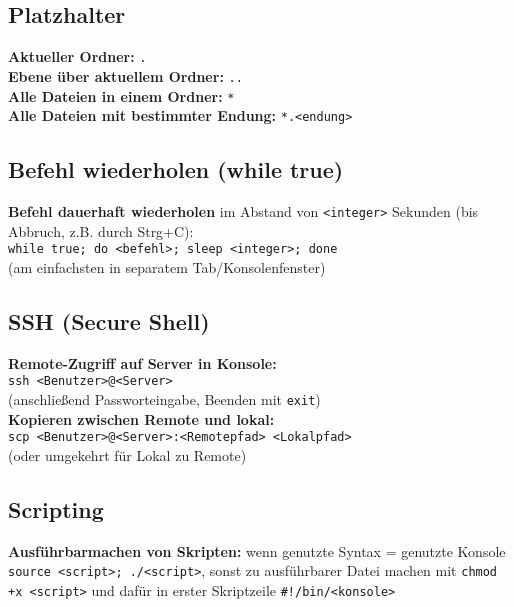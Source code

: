\documentclass[a4paper, twocolumn]{scrarticle}
\begin{document}
\subsection{Platzhalter}
\textbf{Aktueller Ordner:} \lstinline|.|\\
\textbf{Ebene über aktuellem Ordner:} \lstinline|..|\\
\textbf{Alle Dateien in einem Ordner:} \lstinline|*|\\
\textbf{Alle Dateien mit bestimmter Endung:} \lstinline|*.<endung>|

\subsection{Befehl wiederholen (while true)}\label{sec:bash-whiletrue}
\textbf{Befehl dauerhaft wiederholen} im Abstand von \lstinline|<integer>| Sekunden (bis Abbruch, z.B. durch Strg+C):\\ \lstinline|while true; do <befehl>; sleep <integer>; done|\\
(am einfachsten in separatem Tab/Konsolenfenster)

\subsection{SSH (Secure Shell)}
\textbf{Remote-Zugriff auf Server in Konsole:}\\
\lstinline|ssh <Benutzer>@<Server>|\\
(anschließend Passworteingabe, Beenden mit \lstinline|exit|)\\
\textbf{Kopieren zwischen Remote und lokal:}\\
\lstinline|scp <Benutzer>@<Server>:<Remotepfad> <Lokalpfad>|\\
(oder umgekehrt für Lokal zu Remote)

\subsection{Scripting}
\textbf{Ausführbarmachen von Skripten:} wenn genutzte Syntax = genutzte Konsole \lstinline|source <script>; ./<script>|, sonst zu ausführbarer Datei machen mit \lstinline|chmod +x <script>| und dafür in erster Skriptzeile \lstinline|#!/bin/<konsole>| 
\end{document}
